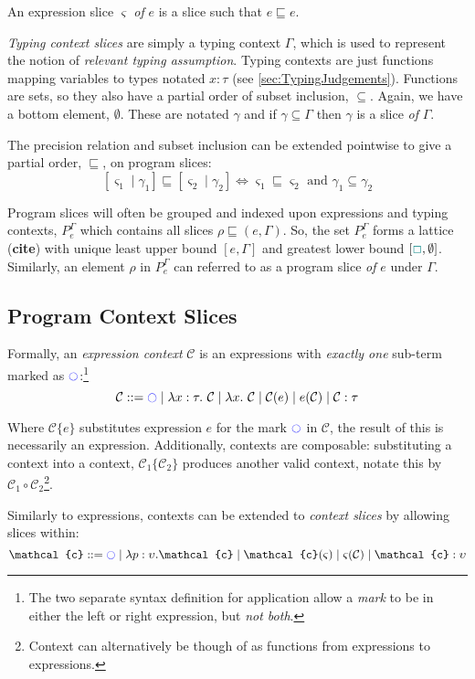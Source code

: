 An expression slice $\varsigma$ \textit{of} $e$ is a slice such that $e \sqsubseteq e$.

\textit{Typing context slices} are simply a typing context $\Gamma$, which is used to represent the notion of \textit{relevant typing assumption}. Typing contexts are just functions mapping variables to types notated $x : \tau$ (see \cref{sec:TypingJudgements}). Functions are sets, so they also have a partial order of subset inclusion, $\subseteq$. Again, we have a bottom element, $\emptyset$.  These are notated $\gamma$ and if $\gamma \subseteq \Gamma$ then $\gamma$ is a slice \textit{of} $\Gamma$.

The precision relation and subset inclusion can be extended pointwise to give a partial order, $\sqsubseteq$, on program slices:
\[[\varsigma_1\mid \gamma_1] \sqsubseteq [\varsigma_2\mid \gamma_2] \iff  \varsigma_1 \sqsubseteq \varsigma_2 \text{ and } \gamma_1 \subseteq \gamma_2\]

Program slices will often be grouped and indexed upon expressions and typing contexts, $P_e^{\Gamma}$ which contains all slices $\rho \sqsubseteq (e, \Gamma)$. So, the set $P_e^{\Gamma}$ forms a lattice (\textbf{cite}) with unique least upper bound $[e, \Gamma]$ and greatest lower bound $[{\color{teal}\Box}, \emptyset]$. Similarly, an element $\rho$ in $P_e^{\Gamma}$ can referred to as a program slice \textit{of} $e$ under $\Gamma$.
\subsection{Program Context Slices}


\newcommand{\C}{\mathcal{C}}
Formally, an \textit{expression context} $\mathcal{C}$ is an expressions with \textit{exactly one} sub-term marked as $\mark$:\footnote{The two separate syntax definition for application allow a \textit{mark} to be in either the left or right expression, but \textit{not both}.}
\[\C ::=  \mark \mid \lambda x : \tau.\ \C \mid \lambda x.\ \C \mid \C(e) \mid e(\C) \mid \C : \tau\]

Where $\C\{e\}$ substitutes expression $e$ for the mark $\mark$ in $\C$, the result of this is necessarily an expression. Additionally, contexts are composable: substituting a context into a context, $\C_1\{\C_2\}$ produces another valid context, notate this by $\C_1 \circ \C_2$\footnote{Context can alternatively be though of as functions from expressions to expressions.}.


\newcommand{\Cs}{\mathcal{c}}
\newcommand{\p}{\mathcal{p}}
Similarly to expressions, contexts can be extended to \textit{context slices} by allowing slices within:
\[\Cs ::= \mark \mid \lambda p : \upsilon. \Cs \mid \Cs(\varsigma) \mid \varsigma(\C) \mid \Cs : \upsilon\]

